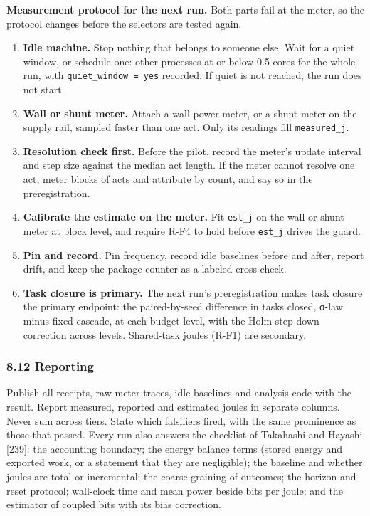 \documentclass[
  10pt,
]{article}
\providecommand{\tightlist}{%
  \setlength{\itemsep}{0pt}\setlength{\parskip}{0pt}}
\begin{document}
\textbf{Measurement protocol for the next run.} Both parts fail at the
meter, so the protocol changes before the selectors are tested again.

\begin{enumerate}
\def\labelenumi{\arabic{enumi}.}
\tightlist
\item
  \textbf{Idle machine.} Stop nothing that belongs to someone else. Wait
  for a quiet window, or schedule one: other processes at or below 0.5
  cores for the whole run, with \texttt{quiet\_window\ =\ yes} recorded.
  If quiet is not reached, the run does not start.
\item
  \textbf{Wall or shunt meter.} Attach a wall power meter, or a shunt
  meter on the supply rail, sampled faster than one act. Only its
  readings fill \texttt{measured\_j}.
\item
  \textbf{Resolution check first.} Before the pilot, record the meter's
  update interval and step size against the median act length. If the
  meter cannot resolve one act, meter blocks of acts and attribute by
  count, and say so in the preregistration.
\item
  \textbf{Calibrate the estimate on the meter.} Fit \texttt{est\_j} on
  the wall or shunt meter at block level, and require R-F4 to hold
  before \texttt{est\_j} drives the guard.
\item
  \textbf{Pin and record.} Pin frequency, record idle baselines before
  and after, report drift, and keep the package counter as a labeled
  cross-check.
\item
  \textbf{Task closure is primary.} The next run's preregistration makes
  task closure the primary endpoint: the paired-by-seed difference in
  tasks closed, σ-law minus fixed cascade, at each budget level, with
  the Holm step-down correction across levels. Shared-task joules (R-F1)
  are secondary.
\end{enumerate}

\subsubsection{8.12 Reporting}\label{reporting}

Publish all receipts, raw meter traces, idle baselines and analysis code
with the result. Report measured, reported and estimated joules in
separate columns. Never sum across tiers. State which falsifiers fired,
with the same prominence as those that passed. Every run also answers
the checklist of Takahashi and Hayashi {[}239{]}: the accounting
boundary; the energy balance terms (stored energy and exported work, or
a statement that they are negligible); the baseline and whether joules
are total or incremental; the coarse-graining of outcomes; the horizon
and reset protocol; wall-clock time and mean power beside bits per
joule; and the estimator of coupled bits with its bias correction.
\end{document}
